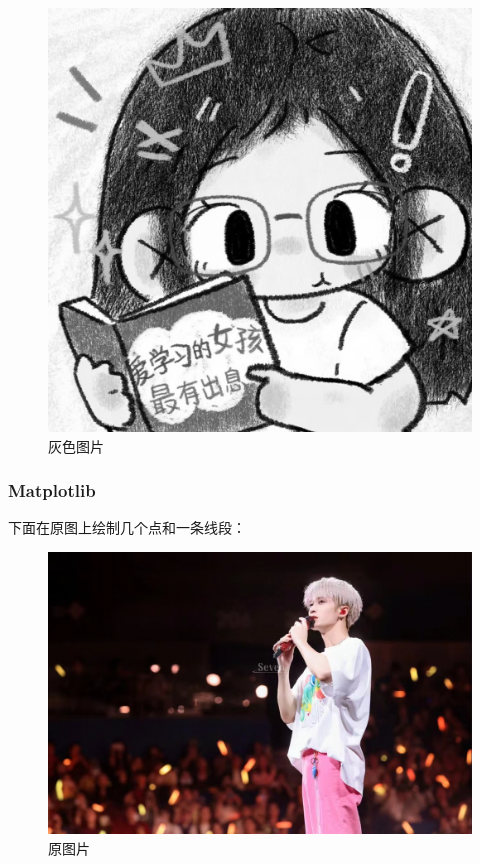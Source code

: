 \documentclass{ctexart}
\begin{document}
	\begin{figure}[H]
		\centering
		\includegraphics[scale=0.05]{3.80}
		\caption{灰色图片}
	\end{figure}
	\subsubsection{Matplotlib}
	下面在原图上绘制几个点和一条线段：
	\begin{figure}[H]
		\centering
		\includegraphics[scale=0.10]{3.91}
		\caption{原图片}
	\end{figure}
	
\end{document}
